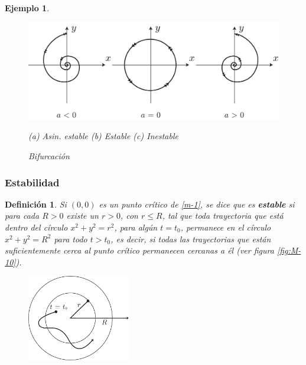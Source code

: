 \documentclass[a5paper,doc,10pt,noapacite]{apa6}
\newtheorem{definicion}{Definición}
\newtheorem{ejem}{Ejemplo}
\begin{document}
{{\begin{ejem}
	\vspace{-1\baselineskip}
	\begin{figure}[H]
		\captionsetup{justification=centering, labelfont=footnotesize, font=footnotesize}
		\centering
		\includegraphics[scale=0.4]{Graficos/figura9}
	
		\footnotesize		
		\hspace{-2.5em}
		(a) Asin. estable	\qquad\qquad
		(b) Estable		\qquad\qquad
		(c) Inestable
		\caption{Bifurcación}
		\label{fig:M-9}
	\end{figure}
	
\end{ejem}


\subsubsection{Estabilidad}

\begin{definicion}
				Si \((0,0)\) es un punto crítico de \eqref{m-1}, se dice que es \emph{\textbf{estable}} si para cada \(R>0\) existe un \(r>0\), con \(r\leq R\), tal que toda trayectoria que está dentro del círculo \(x^2+y^2=r^2\), para algún  \(t=t_0\), permanece en el círculo \(x^2+y^2=R^2\) para todo \(t>t_0\), es decir, si todas las trayectorias que están suficientemente cerca al punto crítico permanecen cercanas a él (ver figura \ref{fig:M-10}).

\vspace{-1\baselineskip}
	\begin{figure}[H]
		\captionsetup{justification=centering, labelfont=footnotesize, font=footnotesize}
		\centering
		\includegraphics[width=4.5cm]{Graficos/figura10}
	

\end{figure}
\end{definicion}}}
\end{document}
